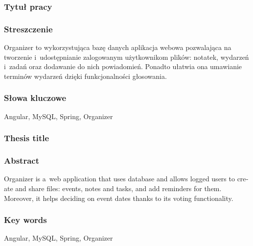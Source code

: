 \documentclass[a4paper,twoside,12pt]{book}
\begin{document}


\cleardoublepage

\rmfamily\normalfont
\pagestyle{empty}



\subsubsection*{Tytuł pracy} 
\Title

\subsubsection*{Streszczenie}  
Organizer to wykorzystująca bazę danych aplikacja webowa pozwalająca na tworzenie i~udostępnianie zalogowanym użytkownikom plików: notatek, wydarzeń i~zadań oraz dodawanie do nich powiadomień. Ponadto ułatwia ona umawianie terminów wydarzeń dzięki funkcjonalności głosowania.

\subsubsection*{Słowa kluczowe} 
Angular, MySQL, Spring, Organizer

\subsubsection*{Thesis title} 
\begin{otherlanguage}{british}
\TitleAlt
\end{otherlanguage}

\subsubsection*{Abstract} 
\begin{otherlanguage}{british}
Organizer is a~web application that uses database and allows logged users to create and share files: events, notes and tasks, and add reminders for them. Moreover, it helps deciding on event dates thanks to its voting functionality.
\end{otherlanguage}
\subsubsection*{Key words}  
\begin{otherlanguage}{british}
Angular, MySQL, Spring, Organizer
\end{otherlanguage}
\end{document}
